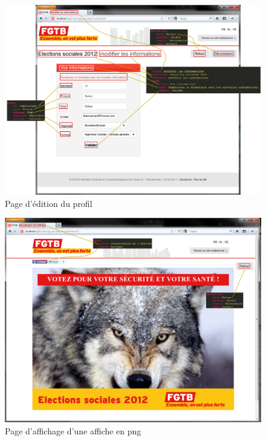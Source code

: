 \documentclass{article}
\begin{document}
\begin{sffamily}
\begin{figure}[!h]
\includegraphics[angle=-90,width=\textwidth]{messages_profile.png}
\caption{Page d'édition du profil}
\end{figure}

\begin{figure}[!h]
\includegraphics[angle=-90,width=\textwidth]{messages_show.png}
\caption{Page d'affichage d'une affiche en png}
\end{figure}


\end{sffamily}
\end{document}

